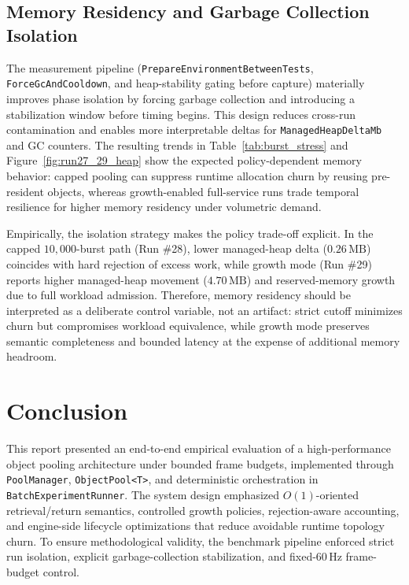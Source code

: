 \documentclass[11pt]{article}
\begin{document}
\subsection{Memory Residency and Garbage Collection Isolation}

The measurement pipeline (\texttt{PrepareEnvironmentBetweenTests}, \texttt{ForceGcAndCooldown}, and heap-stability gating before capture) materially improves phase isolation by forcing garbage collection and introducing a stabilization window before timing begins. This design reduces cross-run contamination and enables more interpretable deltas for \texttt{ManagedHeapDeltaMb} and GC counters. The resulting trends in Table~\ref{tab:burst_stress} and Figure~\ref{fig:run27_29_heap} show the expected policy-dependent memory behavior: capped pooling can suppress runtime allocation churn by reusing pre-resident objects, whereas growth-enabled full-service runs trade temporal resilience for higher memory residency under volumetric demand.

Empirically, the isolation strategy makes the policy trade-off explicit. In the capped \(10{,}000\)-burst path (Run \#28), lower managed-heap delta (\(0.26\,\mathrm{MB}\)) coincides with hard rejection of excess work, while growth mode (Run \#29) reports higher managed-heap movement (\(4.70\,\mathrm{MB}\)) and reserved-memory growth due to full workload admission. Therefore, memory residency should be interpreted as a deliberate control variable, not an artifact: strict cutoff minimizes churn but compromises workload equivalence, while growth mode preserves semantic completeness and bounded latency at the expense of additional memory headroom.

\section{Conclusion}

This report presented an end-to-end empirical evaluation of a high-performance object pooling architecture under bounded frame budgets, implemented through \texttt{PoolManager}, \texttt{ObjectPool<T>}, and deterministic orchestration in \texttt{BatchExperimentRunner}. The system design emphasized \(O(1)\)-oriented retrieval/return semantics, controlled growth policies, rejection-aware accounting, and engine-side lifecycle optimizations that reduce avoidable runtime topology churn. To ensure methodological validity, the benchmark pipeline enforced strict run isolation, explicit garbage-collection stabilization, and fixed-\(60\,\mathrm{Hz}\) frame-budget control.
\end{document}
